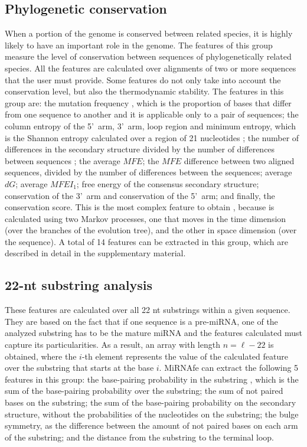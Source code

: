 \documentclass{article}
\begin{document}
\subsection{Phylogenetic conservation}
When a portion of the genome is conserved between related species, it is highly likely to have an important role in the genome. The features of this group
measure the level of conservation between sequences of phylogenetically related species. All the features are calculated over alignments of two or more
sequences that the user must provide. Some features do not only take into account the conservation level, but also the thermodynamic stability. The features in
this group are: the mutation frequency \citep{Huang07}, which is the proportion of bases that differ from one sequence to another and it is applicable only to
a pair of sequences; the column entropy of the 5\textquoteright~arm, 3\textquoteright~arm, loop region and minimum entropy, which is the Shannon entropy
calculated over a region of 21 nucleotides \citep{Hertel06}; the number of differences in the secondary structure divided by the number of differences between
sequences \citep{Huang07}; the average $MFE$; the $MFE$ difference between two aligned sequences, divided by the number of differences between the
sequences\citep{Huang07}; average $dG$; average $MFEI_{1}$; free energy of the consensus secondary structure; conservation of the 3\textquoteright~arm and
conservation of the 5\textquoteright~arm; and finally, the conservation score. This is the most complex feature to obtain \citep{Goro07}, because is calculated
using two Markov processes, one that moves in the time dimension (over the branches of the evolution tree), and the other in space dimension (over the
sequence). A total of 14 features can be extracted in this group, which are described in detail in the supplementary material.

\subsection{22-nt substring analysis}
These features are calculated over all 22 nt substrings within a given sequence. They are based on the fact that if one sequence is a pre-miRNA, one of the
analyzed substring has to be the mature miRNA and the features calculated must capture its particularities. As a result, an array with length $n = \ell - 22$
is obtained, where the $i$-th element represents the value of the calculated feature over the substring that starts at the base $i$. MiRNAfe can extract the
following 5 features in this group: the base-pairing probability in the substring \citep{Lim03}, which is the sum of the base-pairing probability over the
substring; the sum of not paired bases on the substring; the sum of the base-pairing probability on the secondary structure, without the probabilities of the
nucleotides on the substring; the bulge symmetry, as the difference between the amount of not paired bases on each arm of the substring; and the distance from
the substring to the terminal loop.
\end{document}
